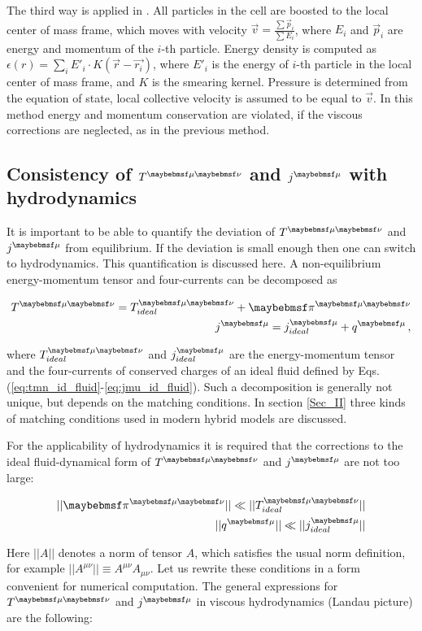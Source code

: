 The third way is applied in \cite{Bhalerao:2015iya}. All particles in the cell
are boosted to the local center of mass frame, which moves with velocity
$\vec{v} = \frac{\sum \vec{p}_i}{\sum E_i}$, where $E_i$ and $\vec{p}_i$ are
energy and momentum of the $i$-th particle. Energy density is computed as
$\epsilon(r) = \sum_i E'_i \cdot K(\vec{r}-\vec{r_i})$, where $E'_i$ is the
energy of $i$-th particle in the local center of mass frame, and $K$ is the
smearing kernel. Pressure is determined from the equation of state, local
collective velocity is assumed to be equal to $\vec{v}$. In this method energy
and momentum conservation are violated, if the viscous corrections are neglected, as
in the previous method.


\subsection{Consistency of $\Tmn$ and $\jmu$ with hydrodynamics} \label{Sec_III}

It is important to be able to quantify the deviation of $\Tmn$ and $\jmu$ from
equilibrium. If the deviation is small enough then one can switch to hydrodynamics.
This quantification is discussed here. A non-equilibrium energy-momentum tensor and
four-currents can be decomposed as

\begin{align}
  \Tmn = \Tmn_{ideal} + \pi^{\mu \nu} \\
  \jmu = \jmu_{ideal} + q^{\mu} \,,
\end{align}

where $\Tmn_{ideal}$ and $\jmu_{ideal}$ are the energy-momentum tensor and the
four-currents of conserved charges of an ideal fluid defined by Eqs.
(\ref{eq:tmn_id_fluid}-\ref{eq:jmu_id_fluid}). Such a decomposition is generally
not unique, but depends on the matching conditions. In section \ref{Sec_II}
three kinds of matching conditions used in modern hybrid models are discussed.

For the applicability of hydrodynamics it is required that the corrections
to the ideal fluid-dynamical form of $\Tmn$ and $\jmu$ are not too large:

\begin{align}
  ||\pi^{\mu \nu}|| \ll ||\Tmn_{ideal}|| \label{EqI} \\
  ||q^{\mu}|| \ll ||\jmu_{ideal}|| \label{EqII}
\end{align}

Here $||A||$ denotes a norm of tensor $A$, which satisfies the usual norm
definition, for example $||A^{\mu\nu}|| \equiv A^{\mu\nu}A_{\mu\nu}$. Let us rewrite
these conditions in a form convenient for numerical computation. The general
expressions for $\Tmn$ and $\jmu$ in viscous hydrodynamics (Landau picture) are the
following:


